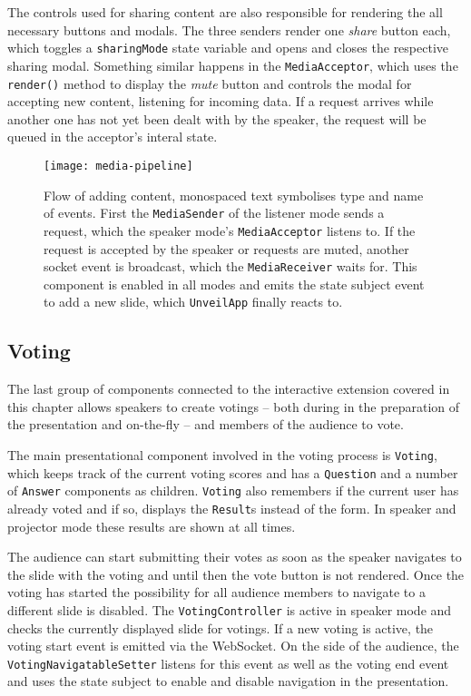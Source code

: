 The controls used for sharing content are also responsible for rendering the all necessary buttons and modals. The three senders render one \emph{share} button each, which toggles a \texttt{sharingMode} state variable and opens and closes the respective sharing modal. Something similar happens in the \texttt{MediaAcceptor}, which uses the \texttt{render()} method to display the \emph{mute} button and controls the modal for accepting new content, listening for incoming data. If a request arrives while another one has not yet been dealt with by the speaker, the request will be queued in the acceptor's interal state.

\begin{figure}
\centering
\texttt{[image: media-pipeline]}
\caption{Flow of adding content, monospaced text symbolises type and name of events. First the \texttt{MediaSender} of the listener mode sends a request, which the speaker mode's \texttt{MediaAcceptor} listens to. If the request is accepted by the speaker or requests are muted, another socket event is broadcast, which the \texttt{MediaReceiver} waits for. This component is enabled in all modes and emits the state subject event to add a new slide, which \texttt{UnveilApp} finally reacts to.}
\label{fig:implementation-interactive-media-pipeline}
\end{figure}

\subsection{Voting}
\label{sec:implementation-interactive-voting}

The last group of components connected to the interactive extension covered in this chapter allows speakers to create votings -- both during in the preparation of the presentation and on-the-fly -- and members of the audience to vote.

The main presentational component involved in the voting process is \texttt{Voting}, which keeps track of the current voting scores and has a \texttt{Question} and a number of \texttt{Answer} components as children. \texttt{Voting} also remembers if the current user has already voted and if so, displays the \texttt{Result}s instead of the form. In speaker and projector mode these results are shown at all times.

The audience can start submitting their votes as soon as the speaker navigates to the slide with the voting and until then the vote button is not rendered. Once the voting has started the possibility for all audience members to navigate to a different slide is disabled. The \texttt{VotingController} is active in speaker mode and checks the currently displayed slide for votings. If a new voting is active, the voting start event is emitted via the WebSocket. On the side of the audience, the \texttt{VotingNavigatableSetter} listens for this event as well as the voting end event and uses the state subject to enable and disable navigation in the presentation.

